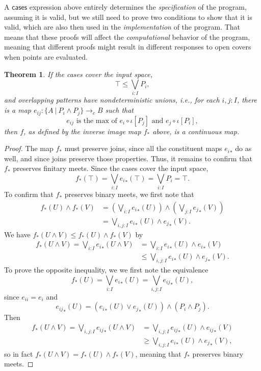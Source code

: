 \documentclass[conference]{IEEEtran}
\newtheorem{theorem}{Theorem}
\newcommand{\cto}{\to_c}
\newcommand{\suchthat}{\ |\ }
\newcommand{\oinclf}[1]{\iota[{#1}]}
\newcommand{\isthemaxof}[3]{{#1}\text{ is the max of }{#2}\text{ and }{#3}}
\begin{document}
A $\mathsf{cases}$ expression above entirely determines the \emph{specification} of the program, assuming it is valid, but we still need to prove two conditions to show that it is valid, which are also then used in the \emph{implementation} of the program. That means that these proofs will affect the \emph{computational} behavior of the program, meaning that different proofs might result in different responses to open covers when points are evaluated. 
\begin{theorem}
\label{pattern}
If the cases cover the input space,
\[
\top \le \bigvee_{i : I} P_i \tag{covering},
\]
and overlapping patterns have nondeterministic unions, i.e., for each $i, j : I$, there is a map $e_{ij} : \{A \suchthat P_i \wedge P_j \} \cto B$ such that
\[
\isthemaxof{ e_{ij} }{ e_i \circ \oinclf{P_j} }{ e_j \circ \oinclf{P_i} }, \tag{gluing}
\]
then $f$, as defined by the inverse image map $f_*$ above, is a continuous map.
\end{theorem}
\begin{proof}
The map $f_*$ must preserve joins, since all the constituent maps ${e_i}_*$ do as well, and since joins preserve those properties. Thus, it remains to confirm that $f_*$ preserves finitary meets.
Since the cases cover the input space,
\[
f_*(\top) = \bigvee_{i : I} {e_i}_*(\top) = \bigvee_{i : I}P_i = \top.
\]
To confirm that $f_*$ preserves binary meets, we first note that
\begin{align*}
f_*(U) \wedge f_*(V) 
  &= \left(\bigvee_{i : I} {e_i}_*(U) \right) \wedge \left( \bigvee_{j: I} {e_j}_*(V) \right)
\\ &= \bigvee_{i, j : I} {e_i}_*(U) \wedge {e_j}_*(V).
\end{align*}
We have $f_*(U \wedge V) \le f_*(U) \wedge f_*(V)$ by
\begin{align*}
f_*(U \wedge V)
  = \bigvee_{i : I} {e_i}_*(U \wedge V)
  &= \bigvee_{i : I} {e_i}_*(U) \wedge {e_i}_*(V)
  \\ &\le \bigvee_{i, j : I} {e_i}_*(U) \wedge {e_j}_*(V).
\end{align*}
To prove the opposite inequality, we we first note the equivalence
\[
f_*(U) = \bigvee_{i : I} {e_i}_*(U) = \bigvee_{i, j : I} {e_{ij}}_*(U),
\]
since $e_{ii} = e_i$ and 
\[
{e_{ij}}_*(U) = \left( {e_i}_*(U) \vee {e_j}_*(U) \right) \wedge \left(P_i \wedge P_j \right).
\]
Then
\begin{align*}
f_*(U \wedge V)
  = \bigvee_{i, j : I} {e_{ij}}_*(U \wedge V)
  &= \bigvee_{i, j : I} {e_{ij}}_*(U) \wedge {e_{ij}}_*(V)
  \\ &\ge \bigvee_{i, j : I} {e_i}_*(U) \wedge {e_j}_*(V),
\end{align*}
so in fact $f_*(U \wedge V) = f_*(U) \wedge f_*(V)$, meaning that $f_*$ preserves binary meets.
\end{proof}
\end{document}
